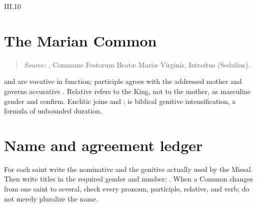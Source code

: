\begin{courseunit}{III.10}
\section{The Marian Common}

\begin{quote}

\emph{Source:} \Missal, Commune Festorum Beatæ Mariæ Virginis, Introitus
(Sedulius).
\end{quote}

 and  are vocative in function; participle
 agrees with the addressed mother and governs accusative
. Relative  refers to the King, not to the mother, as
masculine gender and  confirm. Enclitic  joins
 and ;  is biblical
genitive intensification, a formula of unbounded duration.

\section{Name and agreement ledger}

For each saint write the nominative and the genitive actually used by the
Missal. Then write titles in the required gender and number: . When a Common changes from one saint
to several, check every pronoun, participle, relative, and verb; do not merely
pluralize the name.




\end{courseunit}

